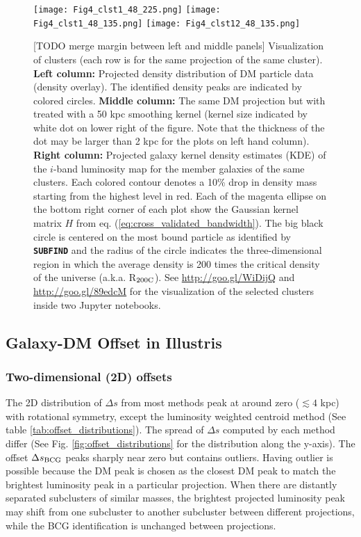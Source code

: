 \begin{figure*}
	\begin{center}
	\texttt{[image: Fig4\_clst1\_48\_225.png]}
	\texttt{[image: Fig4\_clst1\_48\_135.png]}
	\texttt{[image: Fig4\_clst12\_48\_135.png]}
	\caption{[TODO merge margin between left and middle panels] 
		Visualization of clusters (each row is for the same projection
		of the same cluster). {\bf Left column:} Projected density distribution of DM	
		particle data (density overlay). 
		The identified density peaks are indicated by colored circles. 
		{\bf Middle column:} The same DM projection but with treated with a 50 
		kpc smoothing kernel (kernel size indicated by white dot on lower right of
		the figure. Note that the thickness of the dot may be larger than 2 kpc
		for the plots on left hand column).
		{\bf Right column:} Projected galaxy kernel density estimates (KDE) of 
		the $i$-band luminosity map for the member
		galaxies of the same clusters. Each colored contour denotes a 10\% drop 
		in density mass starting from the highest level in red. Each of 
		the magenta ellipse on the
		bottom right corner of each plot show the Gaussian kernel matrix 
		$H$ from eq. (\ref{eq:cross_validated_bandwidth}). 
		The big black 
		circle is centered on the most bound particle as identified by {\bf
		\texttt{SUBFIND}} and the radius of the circle indicates the 
		three-dimensional region in
		which the average density is 200 times the critical density of the universe
		(a.k.a. R$_{\rm 200C}$).
		See \href{http://goo.gl/WiDijQ}{http://goo.gl/WiDijQ} 
		and \href{http://goo.gl/89edcM}{http://goo.gl/89edcM} for the 
		visualization of the selected clusters inside two Jupyter notebooks.
		\label{fig:select_peak_visualization}
	}
\end{center}
\end{figure*}


\subsection{Galaxy-DM Offset in Illustris}

\subsubsection{Two-dimensional (2D) offsets}
The 2D distribution of $\Delta s$ from most methods peak at
around zero ($\lesssim 4$ kpc) with rotational symmetry, 
except the luminosity weighted centroid method (See table 
\ref{tab:offset_distributions}).
The spread of $\Delta s$ computed by each method 
differ (See Fig. \ref{fig:offset_distributions} for the distribution along
the y-axis). The offset $\Delta s_{\rm BCG}$ peaks sharply near zero but 
contains outliers. Having outlier is possible 
because the DM peak is chosen as the closest DM peak to match the
brightest luminosity peak in a particular projection.
When there are distantly separated subclusters of similar masses, 
the brightest projected luminosity peak 
may shift from one subcluster to another subcluster between different projections,
while the BCG identification is unchanged between projections.

